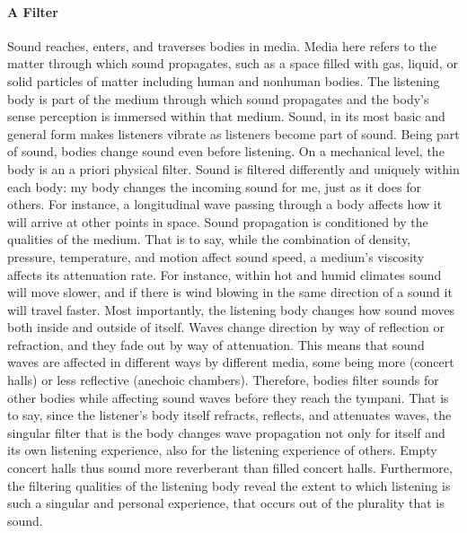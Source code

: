 \paragraph{A Filter}
Sound reaches, enters, and traverses bodies in media. Media here refers to the matter through which sound propagates, such as a space filled with gas, liquid, or solid particles of matter including human and nonhuman bodies. The listening body is part of the medium through which sound propagates and the body's sense perception is immersed within that medium. Sound, in its most basic and general form makes listeners vibrate as listeners become part of sound. Being part of sound, bodies change sound even before listening. On a mechanical level, the body is an a priori physical filter. Sound is filtered differently and uniquely within each body: my body changes the incoming sound for me, just as it does for others. For instance, a longitudinal wave passing through a body affects how it will arrive at other points in space. Sound propagation is conditioned by the qualities of the medium. That is to say, while the combination of density, pressure, temperature, and motion affect sound speed, a medium's viscosity affects its attenuation rate. For instance, within hot and humid climates sound will move slower, and if there is wind blowing in the same direction of a sound it will travel faster. Most importantly, the listening body changes how sound moves both inside and outside of itself. Waves change direction by way of reflection or refraction, and they fade out by way of attenuation. This means that sound waves are affected in different ways by different media, some being more (concert halls) or less reflective (anechoic chambers). Therefore, bodies filter sounds for other bodies while affecting sound waves before they reach the tympani. That is to say, since the listener's body itself refracts, reflects, and attenuates waves, the singular filter that is the body changes wave propagation not only for itself and its own listening experience, also for the listening experience of others. Empty concert halls thus sound more reverberant than filled concert halls. Furthermore, the filtering qualities of the listening body reveal the extent to which listening is such a singular and personal experience, that occurs out of the plurality that is sound.

